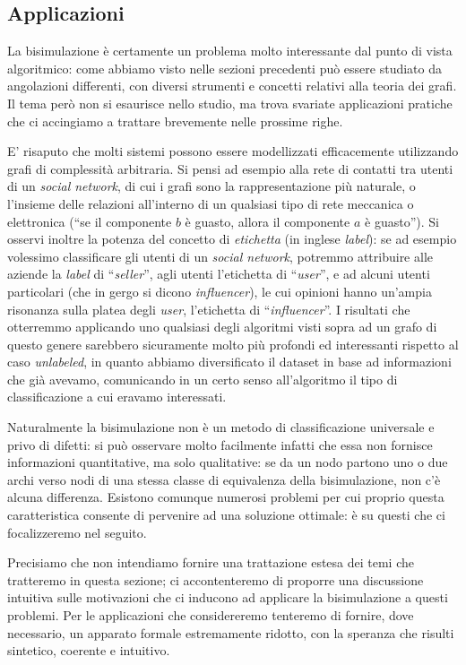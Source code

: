 \subsection{Applicazioni}
\label{sec:applitations}
La bisimulazione è certamente un problema molto interessante dal punto di vista algoritmico: come abbiamo visto nelle sezioni precedenti può essere studiato da angolazioni differenti, con diversi strumenti e concetti relativi alla teoria dei grafi. Il tema però non si esaurisce nello studio, ma trova svariate applicazioni pratiche che ci accingiamo a trattare brevemente nelle prossime righe.

E' risaputo che molti sistemi possono essere modellizzati efficacemente utilizzando grafi di complessità arbitraria. Si pensi ad esempio alla rete di contatti tra utenti di un \emph{social network}, di cui i grafi sono la rappresentazione più naturale, o l'insieme delle relazioni all'interno di un qualsiasi tipo di rete meccanica o elettronica (``se il componente $b$ è guasto, allora il componente $a$ è guasto''). Si osservi inoltre la potenza del concetto di \emph{etichetta} (in inglese \emph{label}): se ad esempio volessimo classificare gli utenti di un \emph{social network}, potremmo attribuire alle aziende la \emph{label} di ``\emph{seller}'', agli utenti l'etichetta di ``\emph{user}'', e ad alcuni utenti particolari (che in gergo si dicono \emph{influencer}), le cui opinioni hanno un'ampia risonanza sulla platea degli \emph{user}, l'etichetta di ``\emph{influencer}''. I risultati che otterremmo applicando uno qualsiasi degli algoritmi visti sopra ad un grafo di questo genere sarebbero sicuramente molto più profondi ed interessanti rispetto al caso \emph{unlabeled}, in quanto abbiamo diversificato il dataset in base ad informazioni che già avevamo, comunicando in un certo senso all'algoritmo il tipo di classificazione a cui eravamo interessati.

Naturalmente la bisimulazione non è un metodo di classificazione universale e privo di difetti: si può osservare molto facilmente infatti che essa non fornisce informazioni quantitative, ma solo qualitative: se da un nodo partono uno o due archi verso nodi di una stessa classe di equivalenza della bisimulazione, non c'è alcuna differenza. Esistono comunque numerosi problemi per cui proprio questa caratteristica consente di pervenire ad una soluzione ottimale: è su questi che ci focalizzeremo nel seguito.

Precisiamo che non intendiamo fornire una trattazione estesa dei temi che tratteremo in questa sezione; ci accontenteremo di proporre una discussione intuitiva sulle motivazioni che ci inducono ad applicare la bisimulazione a questi problemi. Per le applicazioni che considereremo tenteremo di fornire, dove necessario, un apparato formale estremamente ridotto, con la speranza che risulti sintetico, coerente e intuitivo.

